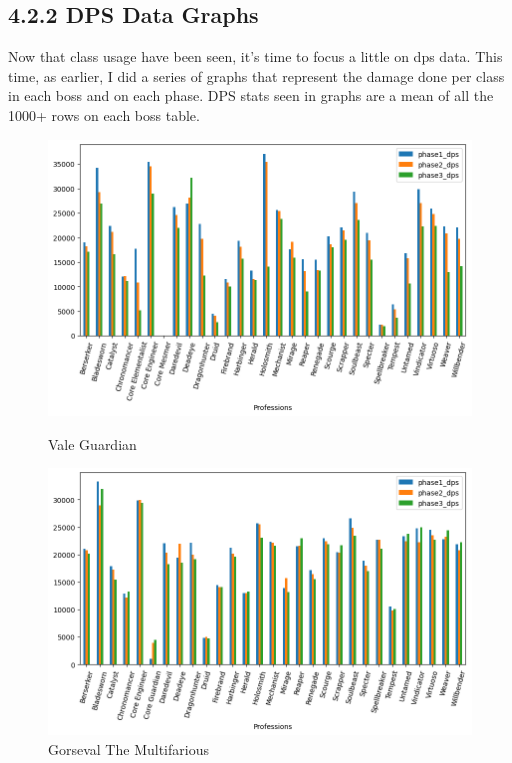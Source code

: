 \documentclass[12pt,a4paper]{article}
\begin{document}
    \subsection*{\normalsize 4.2.2 DPS Data Graphs}
    Now that class usage have been seen, it's time to focus a little on dps data. This time, as earlier,
    I did a series of graphs that represent the damage done per class in each boss and on each phase. DPS
    stats seen in graphs are a mean of all the 1000+ rows on each boss table.

    \newpage

    \begin{figure}[h!]
        
        \centering
        
        \includegraphics[width=1 \linewidth]{vg_dps_plot.png}
        \caption{Vale Guardian}
        \includegraphics[width=1 \linewidth]{gors_dps_plot.png}
        \caption{Gorseval The Multifarious}
    \end{figure}
\end{document}
